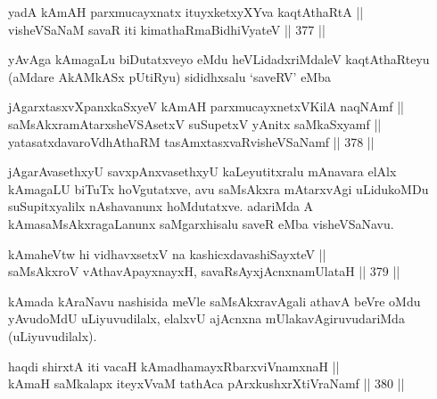 
\begin{shl}
yadA kAmAH parxmucayxnatx ituyxketxyXYva kaqtAthaRtA || \\
visheVSaNaM savaR iti kimathaRmaBidhiVyateV \hfill || 377 ||  
\end{shl}

\begin{artha}
yAvAga kAmagaLu biDutatxveyo eMdu heVLidadxriMdaleV kaqtAthaRteyu
(aMdare AkAMkASx pUtiRyu) sididhxsalu `saveRV' eMba
\end{artha}


\begin{shl}
jAgarxtasxvXpanxkaSxyeV kAmAH parxmucayxnetxV\s KilA naqNAmf || \\
saMsAkxramAtarxsheVSAsetxV suSupetxV yAnitx saMkaSxyamf || \\
yatasatxdavaroVdhAthaRM tasAmxtasxvaRvisheVSaNamf \hfill || 378 ||  
\end{shl}

\begin{artha}
jAgarAvasethxyU savxpAnxvasethxyU kaLeyutitxralu mAnavara elAlx
kAmagaLU biTuTx hoVgutatxve, avu saMsAkxra mAtarxvAgi uLidukoMDu
suSupitxyalilx nAshavanunx hoMdutatxve. adariMda A
kAmasaMsAkxragaLanunx saMgarxhisalu saveR eMba visheVSaNavu.
\end{artha}


\begin{shl}
kAmaheVtw hi vidhavxsetxV na kashicxdavashiSayxteV || \\
saMsAkxroV vA\s thavA\s payxnayxH, savaRsAyxjAcnxnamUlataH \hfill || 379 ||  
\end{shl}

\begin{artha}
kAmada kAraNavu nashisida meVle saMsAkxravAgali athavA beVre oMdu
yAvudoMdU uLiyuvudilalx, elalxvU ajAcnxna mUlakavAgiruvudariMda
(uLiyuvudilalx).
\end{artha}


\begin{shl}
haqdi shirxtA iti vacaH kAmadhamayxRbarxviVnamxnaH || \\
kAmaH saMkalapx iteyxVvaM tathAca pArxkushxrXtiVraNamf \hfill || 380 ||  
\end{shl}

